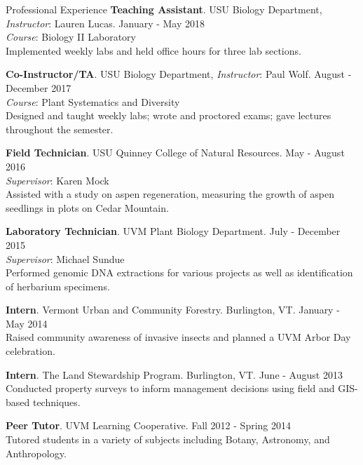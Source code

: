 \documentclass{resume} %
\begin{document}

\begin{rSection}{Professional Experience}
\textbf{Teaching Assistant}. USU Biology Department, \textit{Instructor}: Lauren Lucas. \hfill January - May 2018
\\
\textit{Course}: Biology II Laboratory
\\
Implemented weekly labs and held office hours for three lab sections.

\textbf{Co-Instructor/TA}. USU Biology Department, \textit{Instructor}: Paul Wolf. \hfill August - December 2017
\\
\textit{Course}: Plant Systematics and Diversity
\\
Designed and taught weekly labs; wrote and proctored exams; gave lectures throughout the semester. 

\textbf{Field Technician}. USU Quinney College of Natural Resources. \hfill May - August 2016
\\
\textit{Supervisor}: Karen Mock
\\
Assisted with a study on aspen regeneration, measuring the growth of aspen seedlings in plots on Cedar Mountain.
 
\textbf{Laboratory Technician}. UVM Plant Biology Department. \hfill July - December 2015
\\
\textit{Supervisor}: Michael Sundue
\\
Performed genomic DNA extractions for various projects as well as identification of herbarium specimens.

\textbf{Intern}. Vermont Urban and Community Forestry. Burlington, VT. \hfill January - May 2014 
\\
Raised community awareness of invasive insects and planned a UVM Arbor Day celebration.

\textbf{Intern}. The Land Stewardship Program. Burlington, VT. \hfill June - August 2013 
\\
Conducted property surveys to inform management decisions using field and GIS-based techniques.

\textbf{Peer Tutor}. UVM Learning Cooperative. \hfill Fall 2012 - Spring 2014
\\
Tutored students in a variety of subjects including Botany, Astronomy, and Anthropology.

\end{rSection}
\end{document}
